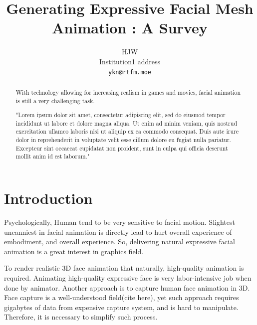\documentclass[10pt,twocolumn,letterpaper]{article}
\begin{document}
\title{Generating Expressive Facial Mesh Animation : A Survey}

\author{
HJW\\
Institution1 address\\
{\tt\small ykn@rtfm.moe}
}
\maketitle

\begin{abstract}
With technology allowing for increasing realism in games and movies, facial animation is still a very challenging task. 

"Lorem ipsum dolor sit amet, consectetur adipiscing elit, sed do eiusmod tempor incididunt ut labore et dolore magna aliqua. Ut enim ad minim veniam, quis nostrud exercitation ullamco laboris nisi ut aliquip ex ea commodo consequat. Duis aute irure dolor in reprehenderit in voluptate velit esse cillum dolore eu fugiat nulla pariatur. Excepteur sint occaecat cupidatat non proident, sunt in culpa qui officia deserunt mollit anim id est laborum."
\end{abstract}

\section{Introduction}
\label{sec:intro}

Psychologically, Human tend to be very sensitive to facial motion. Slightest uncanniest in facial animation is directly lead to hurt overall experience of embodiment, and overall experience\cite{hansonUpendingUncannyValley}. So, delivering natural expressive facial animation is a great interest in graphics field.

To render realistic 3D face animation that naturally, high-quality animation is required. Animating high-quality expressive face is very labor-intensive job when done by animator. Another approach is to capture human face animation in 3D. Face capture is a well-understood field(cite here), yet such approach requires gigabytes of data from expensive capture system, and is hard to manipulate. Therefore, it is necessary to simplify such process. 
\end{document}
